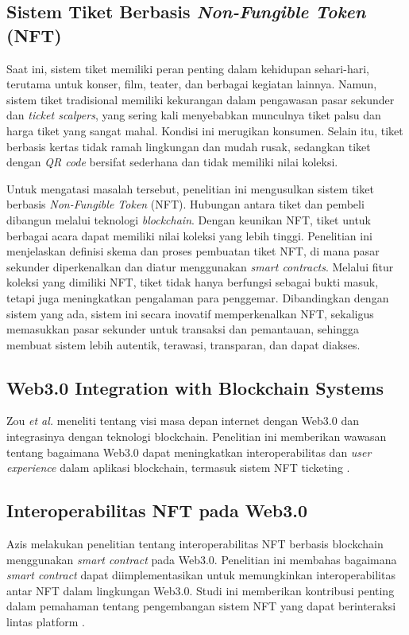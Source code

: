 \subsection{Sistem Tiket Berbasis \textit{Non-Fungible Token} (NFT)}
Saat ini, sistem tiket memiliki peran penting dalam kehidupan sehari-hari, terutama untuk konser, film, teater, dan berbagai kegiatan lainnya. Namun, sistem tiket tradisional memiliki kekurangan dalam pengawasan pasar sekunder dan \textit{ticket scalpers}, yang sering kali menyebabkan munculnya tiket palsu dan harga tiket yang sangat mahal. Kondisi ini merugikan konsumen. Selain itu, tiket berbasis kertas tidak ramah lingkungan dan mudah rusak, sedangkan tiket dengan \textit{QR code} bersifat sederhana dan tidak memiliki nilai koleksi.

Untuk mengatasi masalah tersebut, penelitian ini mengusulkan sistem tiket berbasis \textit{Non-Fungible Token} (NFT). Hubungan antara tiket dan pembeli dibangun melalui teknologi \textit{blockchain}. Dengan keunikan NFT, tiket untuk berbagai acara dapat memiliki nilai koleksi yang lebih tinggi. Penelitian ini menjelaskan definisi skema dan proses pembuatan tiket NFT, di mana pasar sekunder diperkenalkan dan diatur menggunakan \textit{smart contracts}. Melalui fitur koleksi yang dimiliki NFT, tiket tidak hanya berfungsi sebagai bukti masuk, tetapi juga meningkatkan pengalaman para penggemar. Dibandingkan dengan sistem yang ada, sistem ini secara inovatif memperkenalkan NFT, sekaligus memasukkan pasar sekunder untuk transaksi dan pemantauan, sehingga membuat sistem lebih autentik, terawasi, transparan, dan dapat diakses.\parencite{3}

\subsection{Web3.0 Integration with Blockchain Systems}
Zou \textit{et al.} meneliti tentang visi masa depan internet dengan Web3.0 dan integrasinya dengan teknologi blockchain. Penelitian ini memberikan wawasan tentang bagaimana Web3.0 dapat meningkatkan interoperabilitas dan \textit{user experience} dalam aplikasi blockchain, termasuk sistem NFT ticketing \parencite{ref5}.

\subsection{Interoperabilitas NFT pada Web3.0}
Azis melakukan penelitian tentang interoperabilitas NFT berbasis blockchain menggunakan \textit{smart contract} pada Web3.0. Penelitian ini membahas bagaimana \textit{smart contract} dapat diimplementasikan untuk memungkinkan interoperabilitas antar NFT dalam lingkungan Web3.0. Studi ini memberikan kontribusi penting dalam pemahaman tentang pengembangan sistem NFT yang dapat berinteraksi lintas platform \parencite{ref8}.

